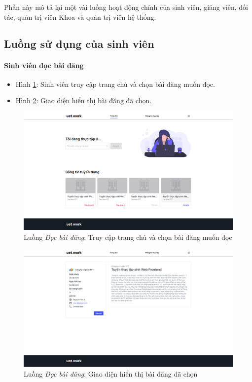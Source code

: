 \documentclass[./../main.tex]{subfiles}
\begin{document}
Phần này mô tả lại một vài luồng hoạt động chính của sinh viên, giảng viên, đối tác, quản trị viên Khoa và quản trị viên hệ thống.

\subsection{Luồng sử dụng của sinh viên}

\paragraph*{Sinh viên đọc bài đăng}

\begin{itemize}
\item Hình \ref{fig:student_home_page}: Sinh viên truy cập trang chủ và chọn bài đăng muốn đọc.
\item Hình \ref{fig:student_read_post_page}: Giao diện hiển thị bài đăng đã chọn.
\end{itemize}

\begin{figure}[]
	\includegraphics[width=\linewidth]{./images/image37.png}
	\caption{Luồng \emph{Đọc bài đăng}: Truy cập trang chủ và chọn bài đăng muốn đọc}
	\label{fig:student_home_page}
\end{figure}

\begin{figure}[]
	\includegraphics[width=\linewidth]{./images/image81.png}
	\caption{Luồng \emph{Đọc bài đăng}: Giao diện hiển thị bài đăng đã chọn}
	\label{fig:student_read_post_page}
\end{figure}
\end{document}

